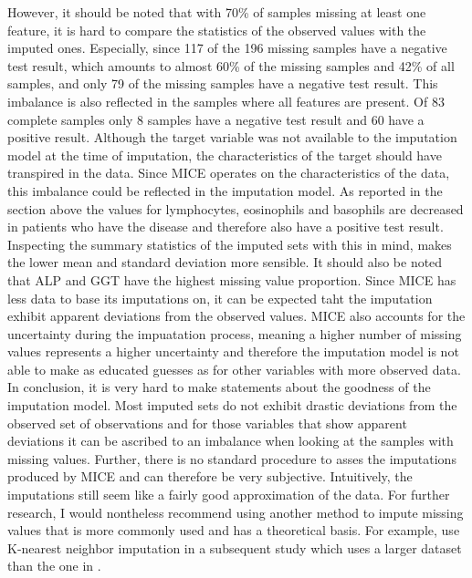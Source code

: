 However, it should be noted that with 70\% of samples missing at least one 
feature, it is hard to compare the statistics of the observed values with the 
imputed ones. Especially, since 117 of the 196 missing samples have a negative 
test result, which amounts to almost 60\% of the missing samples and 42\% of 
all samples, and only 79 of the missing samples have a negative test result. 
This imbalance is also reflected in the samples where all features are present. 
Of 83 complete samples only 8 samples have a negative test result and 60 have a 
positive result. Although the target variable was not available to the 
imputation model at the time of imputation, the characteristics of the target 
should have transpired in the data.
Since MICE operates on the characteristics 
of the data, this imbalance could be reflected in the imputation model. As 
reported in the section above the values for lymphocytes, eosinophils and 
basophils are decreased in patients who have the disease and therefore also 
have a positive test result. Inspecting the summary statistics of the 
imputed sets with this in mind, makes the lower mean and standard deviation 
more sensible.
It should also be noted that ALP and GGT have the highest missing value 
proportion. Since MICE has less data to base its imputations on, it can be 
expected taht the imputation exhibit apparent deviations from the observed 
values. MICE also accounts for the uncertainty during the impuatation process, 
meaning a higher number of missing values represents a higher uncertainty and 
therefore the imputation model is not able to make as educated guesses as for 
other variables with more observed data.
\\
In conclusion, it is very hard to make statements about the goodness of the 
imputation model. Most imputed sets do not exhibit drastic deviations from the 
observed set of observations and for those variables that show apparent 
deviations it can be ascribed to an imbalance when looking at the samples with 
missing values. Further, there is no standard procedure to asses the 
imputations produced by MICE and can therefore be very subjective. Intuitively, 
the imputations still seem like a fairly good approximation of the data.
For further research, I would nontheless recommend using another method to 
impute missing values that is more commonly used and has a theoretical basis. 
For example, \citeauthor{RN127} use K-nearest neighbor imputation in a 
subsequent study \cite{RN179} which uses a larger dataset than the one in 
\cite{RN127}.
